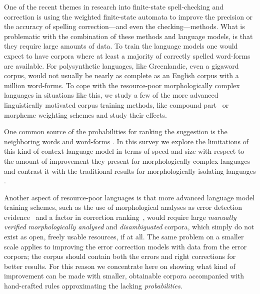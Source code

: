 \documentclass[a4paper,12pt]{article}
\begin{document}
One of the recent themes in research into finite-state spell-checking and
correction is using the weighted finite-state automata to improve the precision
or the accuracy of spelling correction---and even the checking---methods.
What is problematic with the combination of these methods and language models,
is that they require large amounts of data. To train the language models one
would expect to have corpora where at least a majority of correctly spelled
word-forms are available.  For polysynthetic languages, like Greenlandic, even
a gigaword corpus, would not usually be nearly as complete as an English corpus
with a million word-forms. To cope with the resource-poor morphologically
complex languages in situations like this, we study a few of the more
advanced linguistically motivated corpus training methods, like compound
part~\cite[]{pirinen/2009/nodalida} or morpheme weighting schemes and study
their effects.

One common source of the probabilities for ranking the suggestion is the
neighboring words and word-forms \cite[]{pirinen2012improving,otero/2007}.  In
this survey we explore the limitations of this kind of context-language model
in terms of speed and size with respect to the amount of improvement they
present for morphologically complex languages and contrast it with the
traditional results for morphologically isolating languages
\cite[]{mays/1991,wilcoxohearn2008realword}.

Another aspect of resource-poor languages is that more advanced language model
training schemes, such as the use of morphological analyses as error detection
evidence~\cite[]{mays/1991} and a factor in correction
ranking~\cite[]{otero/2007}, would require large \emph{manually verified}
\emph{morphologically analysed} and \emph{disambiguated} corpora, which simply
do not exist as open, freely usable resources, if at all. The same problem on a
smaller scale applies to improving the error correction models with data from
the error corpora; the corpus should contain both the errors and right
corrections for better results. For this reason we concentrate here on showing
what kind of improvement can be made with smaller, obtainable corpora
accompanied with hand-crafted rules approximating the lacking
\emph{probabilities}.
\end{document}
